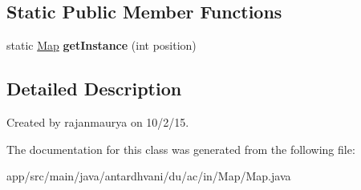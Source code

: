\subsection*{Static Public Member Functions}
\begin{DoxyCompactItemize}
\item 
\hypertarget{classantardhvani_1_1du_1_1ac_1_1in_1_1_map_1_1_map_aec9e39bf6218cd175be86b8f18e32abb}{}static \hyperlink{classantardhvani_1_1du_1_1ac_1_1in_1_1_map_1_1_map}{Map} {\bfseries get\+Instance} (int position)\label{classantardhvani_1_1du_1_1ac_1_1in_1_1_map_1_1_map_aec9e39bf6218cd175be86b8f18e32abb}

\end{DoxyCompactItemize}


\subsection{Detailed Description}
Created by rajanmaurya on 10/2/15. 

The documentation for this class was generated from the following file\+:\begin{DoxyCompactItemize}
\item 
app/src/main/java/antardhvani/du/ac/in/\+Map/Map.\+java\end{DoxyCompactItemize}
